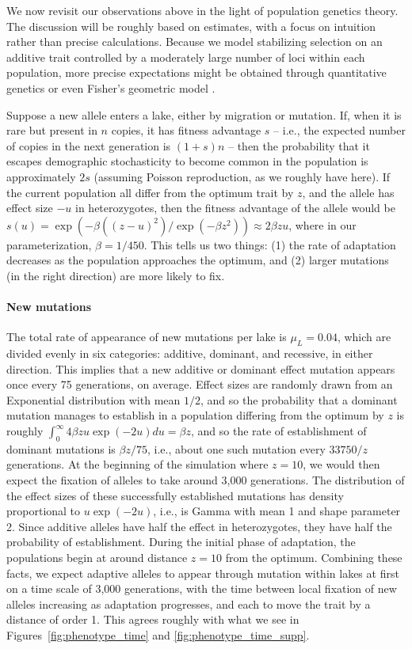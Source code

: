 \documentclass{article}
\begin{document}
We now revisit our observations above in the light of population genetics theory. The discussion will be roughly based on estimates, with a focus on intuition rather than precise calculations. Because we model stabilizing selection on an additive trait controlled by a moderately large number of loci within each population, more precise expectations might be obtained through quantitative genetics \citep{svardal2014general} or even Fisher's geometric model \citep{barton2001hybridization,chevin2014niche}.

Suppose a new allele enters a lake, either by migration or mutation. If, when it is rare but present in $n$ copies, it has fitness advantage $s$ -- i.e., the expected number of copies in the next generation is $(1+s)n$ -- then the probability that it escapes demographic stochasticity to become common in the population is approximately $2s$ \citep{lambert2006probability,haldane1927mathematical} (assuming Poisson reproduction, as we roughly have here). If the current population all differ from the optimum trait by $z$, and the allele has effect size $-u$ in heterozygotes,  then the fitness advantage of the allele would be $s(u) = \exp(-\beta((z - u)^2) / \exp( - \beta z^2)) \approx 2 \beta z u$, where in our parameterization, $\beta = 1 / 450$. This tells us two things: (1) the rate of adaptation decreases as the population approaches the optimum, and (2) larger mutations (in the right direction) are more likely to fix.

\paragraph{New mutations}

The total rate of appearance of new mutations per lake is $\mu_L = 0.04$, which are divided evenly in six categories: additive, dominant, and recessive, in either direction. This implies that a new additive or dominant effect mutation appears once every 75 generations, on average. Effect sizes are randomly drawn from an Exponential distribution with mean $1/2$, 
and so the probability that a dominant mutation manages to establish in a population differing from the optimum by $z$ is roughly $\int_0^\infty 4 \beta z u \exp(-2u) du = \beta z$, 
and so the rate of establishment of dominant mutations is $\beta z / 75$, i.e., about one such mutation every $33750/z$ generations. At the beginning of the simulation where $z = 10$, we would then expect the fixation of alleles to take around 3,000 generations. The distribution of the effect sizes of these successfully established mutations 
has density proportional to $u \exp(-2u)$, i.e., is Gamma with mean 1 and shape parameter 2. Since additive alleles have half the effect in heterozygotes, they have half the probability of establishment. During the initial phase of adaptation, the populations begin at around distance $z=10$ from the optimum. Combining these facts, we expect adaptive alleles to appear through mutation within lakes at first on a time scale of 3,000 generations, with the time between local fixation of new alleles increasing as adaptation progresses, and each to move the trait by a distance of order 1. This agrees roughly with what we see in Figures~\ref{fig:phenotype_time} and \ref{fig:phenotype_time_supp}.
\end{document}
